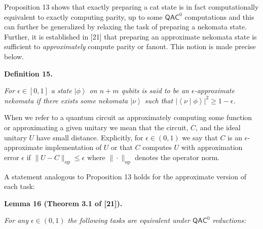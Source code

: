 Proposition 13 shows that exactly preparing a cat state is in fact computationally equivalent to exactly computing parity, up to some ${\mathsf{QAC}}^{0}$ computations and this can further be generalized by relaxing the task of preparing a nekomata state.
Further, it is established in [21] that preparing an approximate nekomata state is sufficient to \emph{approximately} compute parity or fanout. This notion is made precise below.\par





\par\medskip\noindent\textbf{
\textbf{Definition 15}\textbf{.}
}\par



\emph{For $\epsilon\in[0,1]$ a state $\left|\phi\right\rangle$ on $n+m$ qubits is said to be an $\epsilon$-approximate nekomata if there exists some nekomata $\left|\nu\right\rangle$ such that $\left|\left\langle\nu\middle|\phi\right\rangle\right|^{2}\geq 1-\epsilon$.}\par






When we refer to a quantum circuit as approximately computing some function or approximating a given unitary we mean that the circuit, $C$, and the ideal unitary $U$ have small distance. Explicitly, for $\epsilon\in(0,1)$ we say that $C$ is an $\epsilon$-approximate implementation of $U$ or that $C$ computes $U$ with approximation error $\epsilon$ if $\|U-C\|_{\mathrm{op}}\leq\epsilon$ where $\|\cdot\|_{\mathrm{op}}$ denotes the operator norm.\par




A statement analogous to Proposition 13 holds for the approximate version of each task:\par





\par\medskip\noindent\textbf{
\textbf{Lemma 16}\textbf{ }(Theorem 3.1 of [21])\textbf{.}
}\par



\emph{For any $\epsilon\in(0,1)$ the following tasks are equivalent under ${\mathsf{QAC}}^{0}$ reductions:}\par


